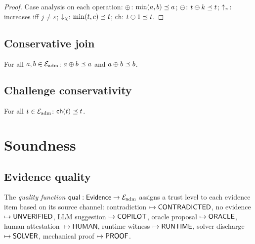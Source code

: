 \documentclass[11pt]{article}
\begin{document}
\begin{proof}
Case analysis on each operation:
$\oplus$: $\min(a,b) \preceq a$;
$\ominus$: $t \ominus k \preceq t$;
$\uparrow_\pi$: increases iff $j \neq \varepsilon$;
$\downarrow_\chi$: $\min(t,c) \preceq t$;
$\mathsf{ch}$: $t \ominus 1 \preceq t$.
\end{proof}

\subsection{Conservative join}\label{sec:inv-join}

\begin{definition}\label{def:cj}
For all $a, b \in \mathcal{E}_{\mathrm{adm}}$: $a \oplus b \preceq a$ and
$a \oplus b \preceq b$.
\end{definition}

\subsection{Challenge conservativity}\label{sec:inv-challenge}

\begin{definition}\label{def:cc}
For all $t \in \mathcal{E}_{\mathrm{adm}}$: $\mathsf{ch}(t) \preceq t$.
\end{definition}


\section{Soundness}\label{sec:soundness}

\subsection{Evidence quality}

\begin{definition}\label{def:quality}
The \emph{quality function} $\mathsf{qual}: \mathsf{Evidence}
\to \mathcal{E}_{\mathrm{adm}}$ assigns a trust level to each evidence item
based on its source channel:
contradiction $\mapsto \mathsf{CONTRADICTED}$,
no evidence $\mapsto \mathsf{UNVERIFIED}$,
LLM suggestion $\mapsto \mathsf{COPILOT}$,
oracle proposal $\mapsto \mathsf{ORACLE}$,
human attestation $\mapsto \mathsf{HUMAN}$,
runtime witness $\mapsto \mathsf{RUNTIME}$,
solver discharge $\mapsto \mathsf{SOLVER}$,
mechanical proof $\mapsto \mathsf{PROOF}$.
\end{definition}
\end{document}

